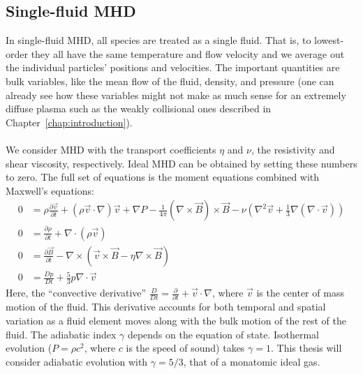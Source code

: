 \subsection{Single-fluid MHD} \label{sec:idealMHD}
In single-fluid MHD, all species are treated as a single fluid. That is, to lowest-order they all have the same temperature and flow velocity and we average out the individual particles' positions and velocities. The important quantities are bulk variables, like the mean flow of the fluid, density, and pressure (one can already see how these variables might not make as much sense for an extremely diffuse plasma such as the weakly collisional ones described in Chapter~\ref{chap:introduction}).\\
\\
We consider MHD with the transport coefficients $\eta$ and $\nu$, the resistivity and shear viscosity, respectively. Ideal MHD can be obtained by setting these numbers to zero. The full set of equations is the moment equations combined with Maxwell's equations:
\begin{align}
  0&=\rho\frac{\partial\vec v}{\partial t}+(\rho\vec v\cdot\nabla)\vec v+\nabla P-\frac1{4\pi}(\nabla\times\vec B)\times\vec B-\nu\left(\nabla^2\vec v+\frac13\nabla(\nabla\cdot\vec v)\right)\label{eq:momentum}\\
  0&=\frac{\partial\rho}{\partial t}+\nabla\cdot(\rho\vec v)\label{eq:continuity}\\
  0&=\frac{\partial \vec B}{\partial t}-\nabla\times(\vec v\times\vec B-\eta\nabla\times\vec B)\label{eq:induction}\\
  0&=\frac{Dp}{Dt}+\frac53p\nabla\cdot\vec v
\end{align}
Here, the ``convective derivative'' $\frac{D}{Dt}=\frac{\partial}{\partial t}+\vec v\cdot\nabla$, where $\vec v$ is the center of mass motion of the fluid. This derivative accounts for both temporal and spatial variation as a fluid element moves along with the bulk motion of the rest of the fluid. The adiabatic index $\gamma$ depends on the equation of state. Isothermal evolution ($P=\rho c^2$, where $c$ is the speed of sound) takes $\gamma=1$. This thesis will consider adiabatic evolution with $\gamma=5/3$, that of a monatomic ideal gas.\\
\\
